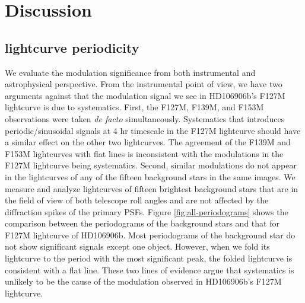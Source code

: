 \documentclass[twocolumn]{aastex62}
\begin{document}


\section{Discussion}
\subsection{lightcurve periodicity}

We evaluate the modulation significance from both instrumental and astrophysical perspective. From the instrumental point of view, we have two arguments against that the modulation signal we see in HD106906b's F127M lightcurve is due to systematics. First, the F127M, F139M, and F153M observations were taken \emph{de facto} simultaneously. Systematics that introduces periodic/sinusoidal signals at 4 hr timescale in the F127M lightcurve should have a similar effect on the other two lightcurves. The agreement of the  F139M and F153M lightcurves with flat lines is inconsistent with the modulations in the F127M lightcurve being systematics. Second, similar modulations do not appear in the lightcurves of any of the fifteen background stars in the same images. We measure and analyze lightcurves of fifteen brightest background stars that are in the field of view of both telescope roll angles and are not affected by the diffraction spikes of the primary PSFs.
Figure \ref{fig:all-periodograms} shows the comparison between the periodograms of the background stars and that for F127M lightcurve of HD106906b. Most periodograms of the background star do not show significant signals except one object. However, when we fold its lightcurve to the period with the most significant peak, the folded lightcurve is consistent with a flat line. These two lines of evidence argue that systematics is unlikely to be the cause of the modulation observed in HD106906b's F127M lightcurve.
\end{document}
